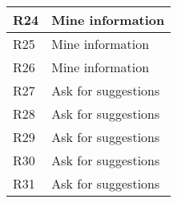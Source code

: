 \begin{table}[H]
\begin{tabularx}{\textwidth}{ |l|X| }
      \hline
      R24 & Mine information \\
      \hline
      R25 & Mine information \\
      \hline
      R26 & Mine information \\
      \hline
      R27 & Ask for suggestions \\
      \hline
      R28 & Ask for suggestions \\
      \hline
      R29 & Ask for suggestions \\
      \hline
      R30 & Ask for suggestions \\
      \hline
      R31 & Ask for suggestions \\
      \hline      
  \end{tabularx}
\end{table}
